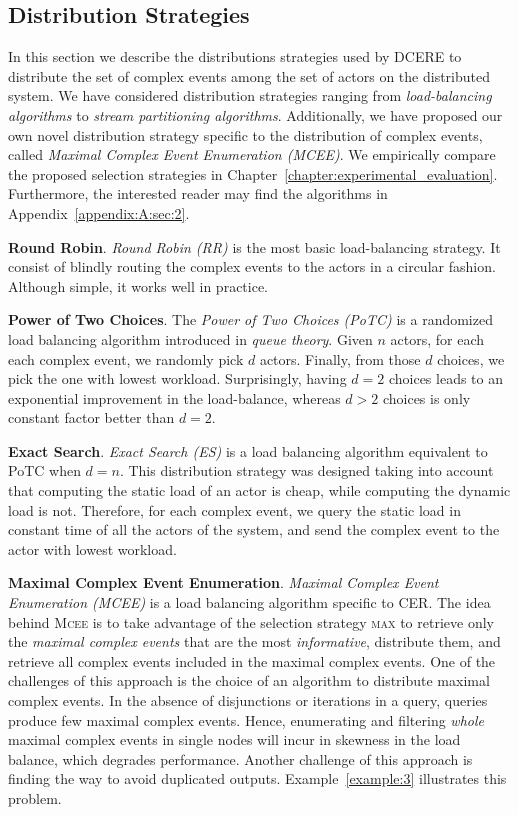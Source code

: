 \subsection{Distribution Strategies}\label{subsec:dcere:distribution-strategies}

In this section we describe the distributions strategies used by DCERE to distribute the set of complex events among the set of actors on the distributed system. We have considered distribution strategies ranging from \emph{load-balancing algorithms} to \emph{stream partitioning algorithms}. Additionally, we have proposed our own novel distribution strategy specific to the distribution of complex events, called \emph{Maximal Complex Event Enumeration (MCEE)}. We empirically compare the proposed selection strategies in Chapter~\ref{chapter:experimental_evaluation}. Furthermore, the interested reader may find the algorithms in Appendix~\ref{appendix:A:sec:2}.

\textbf{Round Robin}. \emph{Round Robin (RR)} is the most basic load-balancing strategy. It consist of blindly routing the complex events to the actors in a circular fashion. Although simple, it works well in practice.

\textbf{Power of Two Choices}. The \emph{Power of Two Choices (PoTC)} \cite{load-balancing-1} is a randomized load balancing algorithm introduced in \emph{queue theory}. Given $n$ actors, for each each complex event, we randomly pick $d$ actors. Finally, from those $d$ choices, we pick the one with lowest workload. Surprisingly, having $d = 2$ choices leads to an exponential improvement in the load-balance, whereas $d > 2$ choices is only constant factor better than $d = 2$.

\textbf{Exact Search}. \emph{Exact Search (ES)} is a load balancing algorithm equivalent to PoTC when $d = n$. This distribution strategy was designed taking into account that computing the static load of an actor is cheap, while computing the dynamic load is not. Therefore, for each complex event, we query the static load in constant time of all the actors of the system, and send the complex event to the actor with lowest workload.

\textbf{Maximal Complex Event Enumeration}.\label{} \emph{Maximal Complex Event Enumeration (MCEE)} is a load balancing algorithm specific to CER. The idea behind \textsc{Mcee} is to take advantage of the selection strategy \textsc{max} to retrieve only the \emph{maximal complex events} that are the most \emph{informative}, distribute them, and retrieve all complex events included in the maximal complex events. One of the challenges of this approach is the choice of an algorithm to distribute maximal complex events. In the absence of disjunctions or iterations in a query, queries produce few maximal complex events. Hence, enumerating and filtering \emph{whole} maximal complex events in single nodes will incur in skewness in the load balance, which degrades performance. Another challenge of this approach is finding the way to avoid duplicated outputs. Example~\ref{example:3} illustrates this problem.

